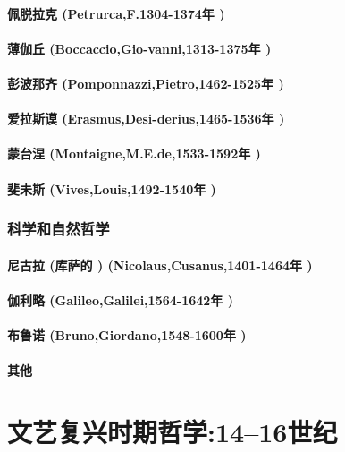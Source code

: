 \documentclass[UTF8]{../RepresentationUniverse}
\begin{document}
    \paragraph{佩脱拉克 (Petrurca,F.1304-1374年 )}
    \paragraph{薄伽丘 (Boccaccio,Gio-vanni,1313-1375年 )}
    \paragraph{彭波那齐 (Pomponnazzi,Pietro,1462-1525年 )}
    \paragraph{爱拉斯谟 (Erasmus,Desi-derius,1465-1536年 )}
    \paragraph{蒙台涅 (Montaigne,M.E.de,1533-1592年 )}
    \paragraph{斐未斯 (Vives,Louis,1492-1540年 )}
\subsubsection{科学和自然哲学}
    \paragraph{尼古拉 (库萨的 ) (Nicolaus,Cusanus,1401-1464年 )}
    \paragraph{伽利略 (Galileo,Galilei,1564-1642年 )}
    \paragraph{布鲁诺 (Bruno,Giordano,1548-1600年 )}
    \paragraph{其他}

    

\section{文艺复兴时期哲学:14–16世纪}
\end{document}
